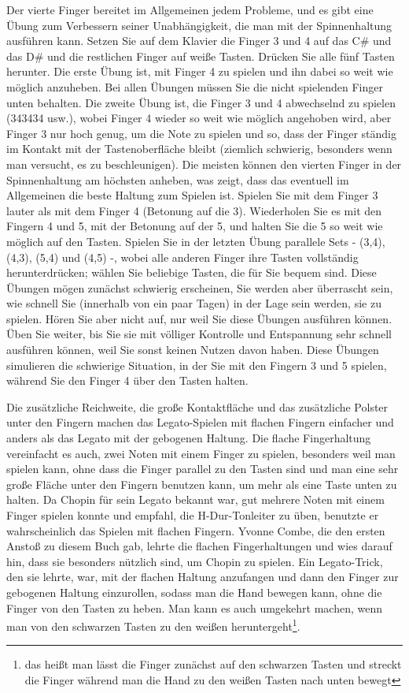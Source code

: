 Der vierte Finger bereitet im Allgemeinen jedem Probleme, und es gibt eine Übung zum Verbessern seiner Unabhängigkeit, die man mit der Spinnenhaltung ausführen kann.
Setzen Sie auf dem Klavier die Finger 3 und 4 auf das C\# und das D\# und die restlichen Finger auf weiße Tasten.
Drücken Sie alle fünf Tasten herunter.
Die erste Übung ist, mit Finger 4 zu spielen und ihn dabei so weit wie möglich anzuheben.
Bei allen Übungen müssen Sie die nicht spielenden Finger unten behalten.
Die zweite Übung ist, die Finger 3 und 4 abwechselnd zu spielen (343434 usw.), wobei Finger 4 wieder so weit wie möglich angehoben wird, aber Finger 3 nur hoch genug, um die Note zu spielen und so, dass der Finger ständig im Kontakt mit der Tastenoberfläche bleibt (ziemlich schwierig, besonders wenn man versucht, es zu beschleunigen).
Die meisten können den vierten Finger in der Spinnenhaltung am höchsten anheben, was zeigt, dass das eventuell im Allgemeinen die beste Haltung zum Spielen ist.
Spielen Sie mit dem Finger 3 lauter als mit dem Finger 4 (Betonung auf die 3).
Wiederholen Sie es mit den Fingern 4 und 5, mit der Betonung auf der 5, und halten Sie die 5 so weit wie möglich auf den Tasten.
Spielen Sie in der letzten Übung parallele Sets - (3,4), (4,3), (5,4) und (4,5) -, wobei alle anderen Finger ihre Tasten vollständig herunterdrücken; wählen Sie beliebige Tasten, die für Sie bequem sind.
Diese Übungen mögen zunächst schwierig erscheinen, Sie werden aber überrascht sein, wie schnell Sie (innerhalb von ein paar Tagen) in der Lage sein werden, sie zu spielen.
Hören Sie aber nicht auf, nur weil Sie diese Übungen ausführen können.
Üben Sie weiter, bis Sie sie mit völliger Kontrolle und Entspannung sehr schnell ausführen können, weil Sie sonst keinen Nutzen davon haben.
Diese Übungen simulieren die schwierige Situation, in der Sie mit den Fingern 3 und 5 spielen, während Sie den Finger 4 über den Tasten halten.

Die zusätzliche Reichweite, die große Kontaktfläche und das zusätzliche Polster unter den Fingern machen das Legato-Spielen mit flachen Fingern einfacher und anders als das Legato mit der gebogenen Haltung.
Die flache Fingerhaltung vereinfacht es auch, zwei Noten mit einem Finger zu spielen, besonders weil man spielen kann, ohne dass die Finger parallel zu den Tasten sind und man eine sehr große Fläche unter den Fingern benutzen kann, um mehr als eine Taste unten zu halten.
Da Chopin für sein Legato bekannt war, gut mehrere Noten mit einem Finger spielen konnte und empfahl, die H-Dur-Tonleiter zu üben, benutzte er wahrscheinlich das Spielen mit flachen Fingern.
Yvonne Combe, die den ersten Anstoß zu diesem Buch gab, lehrte die flachen Fingerhaltungen und wies darauf hin, dass sie besonders nützlich sind, um Chopin zu spielen.
Ein Legato-Trick, den sie lehrte, war, mit der flachen Haltung anzufangen und dann den Finger zur gebogenen Haltung einzurollen, sodass man die Hand bewegen kann, ohne die Finger von den Tasten zu heben.
Man kann es auch umgekehrt machen, wenn man von den schwarzen Tasten zu den weißen heruntergeht\footnote{das heißt man lässt die Finger zunächst auf den schwarzen Tasten und streckt die Finger während man die Hand zu den weißen Tasten nach unten bewegt}.

